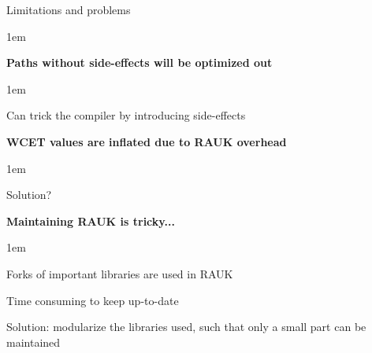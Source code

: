 \begin{frame}{Limitations and problems}
    \begin{itemize-size}{1em}
            \item \textbf{Paths without side-effects will be optimized out}
                \begin{itemize-size}{1em}
                    \item Can trick the compiler by introducing side-effects
                \end{itemize-size}
            \item \textbf{WCET values are inflated due to RAUK overhead}
                \begin{itemize-size}{1em}
                    \item Solution?
                \end{itemize-size}
            \item \textbf{Maintaining RAUK is tricky...}
                \begin{itemize-size}{1em}
                    \item Forks of important libraries are used in RAUK
                    \item Time consuming to keep up-to-date
                    \item Solution: modularize the libraries used, such
                    that only a small part can be maintained
                \end{itemize-size}
        \end{itemize-size}
\end{frame}
